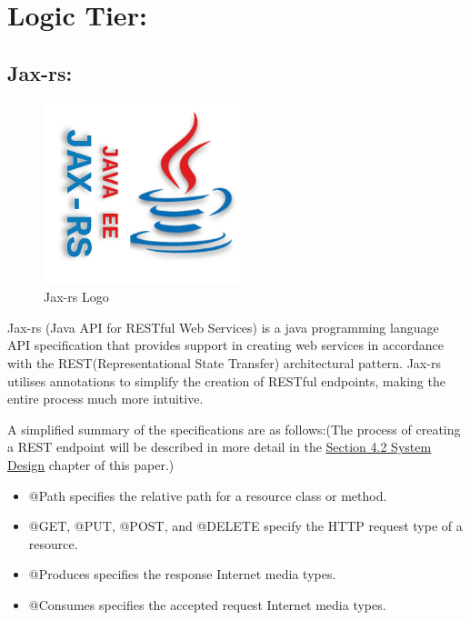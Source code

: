 \section{Logic Tier:}
\label{sec:TechnologyReviewLogicTier}
\subsection{Jax-rs:}
\label{sec:TechnologyReviewJax}

\begin{figure}[H]
    \centering
    \includegraphics[width=\textwidth, height=150pt]{img/Jax-rsLogo.PNG}
    \caption{Jax-rs Logo}
    \label{fig:my_label}
\end{figure}

\bigskip

Jax-rs (Java API for RESTful Web Services) is a java programming language API specification that provides support in creating web services in accordance with the REST(Representational State Transfer) architectural pattern. Jax-rs utilises annotations to simplify the creation of RESTful endpoints, making the entire process much more intuitive\cite{burke2009restful}. 

\bigskip

A simplified summary of the specifications are as follows:(The process of creating a REST endpoint will be described in more detail in the \hyperref[sec:SystemDesignLogic]{\underline{Section 4.2 System Design}} chapter of this paper.)


\bigskip
\begin{itemize}
\item @Path specifies the relative path for a resource class or method. 


\item @GET, @PUT, @POST, and @DELETE specify the HTTP request type of a resource.


\item @Produces specifies the response Internet media types.


\item @Consumes specifies the accepted request Internet media types.
\end{itemize}
\bigskip


